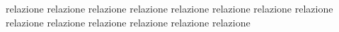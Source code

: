 \documentclass[11pt, twoside, twocolumn, a4paper, draft]{article}
\numberwithin{equation}{section}
\numberwithin{figure}{section}
\numberwithin{table}{section}
\begin{document}
	

    \twocolumn

	{relazione}
    \twocolumn
	{relazione}
    \twocolumn
	{relazione}
    \twocolumn
	{relazione}
    \twocolumn
	{relazione}
    \twocolumn
	{relazione}
    \twocolumn
	{relazione}
    \twocolumn
	{relazione}
    \twocolumn
	{relazione}
    \twocolumn
	{relazione}
    \twocolumn
	{relazione}
    \twocolumn
	{relazione}
    \twocolumn
	{relazione}
    \twocolumn
	{relazione}
\end{document}
